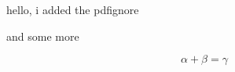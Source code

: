 \documentclass{article}
\begin{document}
hello, i added the pdfignore

and some more

$$\alpha + \beta = \gamma$$
\end{document}

